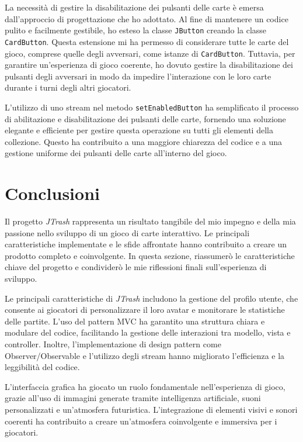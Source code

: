 La necessità di gestire la disabilitazione dei pulsanti delle carte è emersa dall'approccio di progettazione che ho adottato. Al fine di mantenere un codice pulito e facilmente gestibile, ho esteso la classe \texttt{JButton} creando la classe \texttt{CardButton}. Questa estensione mi ha permesso di considerare tutte le carte del gioco, comprese quelle degli avversari, come istanze di \texttt{CardButton}. Tuttavia, per garantire un'esperienza di gioco coerente, ho dovuto gestire la disabilitazione dei pulsanti degli avversari in modo da impedire l'interazione con le loro carte durante i turni degli altri giocatori.

L'utilizzo di uno stream nel metodo \texttt{setEnabledButton} ha semplificato il processo di abilitazione e disabilitazione dei pulsanti delle carte, fornendo una soluzione elegante e efficiente per gestire questa operazione su tutti gli elementi della collezione. Questo ha contribuito a una maggiore chiarezza del codice e a una gestione uniforme dei pulsanti delle carte all'interno del gioco.

\section{Conclusioni}
Il progetto \textit{JTrash} rappresenta un risultato tangibile del mio impegno e della mia passione nello sviluppo di un gioco di carte interattivo. Le principali caratteristiche implementate e le sfide affrontate hanno contribuito a creare un prodotto completo e coinvolgente. In questa sezione, riassumerò le caratteristiche chiave del progetto e condividerò le mie riflessioni finali sull'esperienza di sviluppo.

Le principali caratteristiche di \textit{JTrash} includono la gestione del profilo utente, che consente ai giocatori di personalizzare il loro avatar e monitorare le statistiche delle partite. L'uso del pattern MVC ha garantito una struttura chiara e modulare del codice, facilitando la gestione delle interazioni tra modello, vista e controller. Inoltre, l'implementazione di design pattern come Observer/Observable e l'utilizzo degli stream hanno migliorato l'efficienza e la leggibilità del codice.

L'interfaccia grafica ha giocato un ruolo fondamentale nell'esperienza di gioco, grazie all'uso di immagini generate tramite intelligenza artificiale, suoni personalizzati e un'atmosfera futuristica. L'integrazione di elementi visivi e sonori coerenti ha contribuito a creare un'atmosfera coinvolgente e immersiva per i giocatori.

